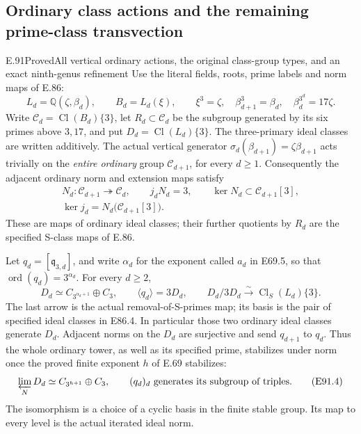 \subsection{Ordinary class actions and the remaining prime-class transvection}

\begin{statement}{E.91}{Proved}{All vertical ordinary actions, the original class-group types, and an exact ninth-genus refinement}
Use the literal fields, roots, prime labels and norm maps of E.86:
\[
 L_d=\mathbb Q(\zeta,\beta_d),\qquad
 B_d=L_d(\xi),\qquad
 \xi^3=\zeta,\quad \beta_{d+1}^3=\beta_d,\quad
 \beta_d^{3^d}=17\zeta .
 \tag{E91.1}
\]
Write $\mathcal C_d=\operatorname{Cl}(B_d)\{3\}$, let $R_d\subset \mathcal C_d$
be the subgroup generated by its six primes above $3,17$, and put
$D_d=\operatorname{Cl}(L_d)\{3\}$. The three-primary ideal
classes are written additively. The actual vertical generator
$\sigma_d(\beta_{d+1})=\zeta\beta_{d+1}$ acts trivially on
the \emph{entire ordinary} group $\mathcal C_{d+1}$, for every $d\ge1$.
Consequently the adjacent ordinary norm and extension maps satisfy
\[
 \begin{gathered}
 N_d:\mathcal C_{d+1}\twoheadrightarrow \mathcal C_d,\qquad
 j_dN_d=3,\qquad
 \ker N_d\subset \mathcal C_{d+1}[3],\\
 \ker j_d=N_d\bigl(\mathcal C_{d+1}[3]\bigr).
 \end{gathered}
 \tag{E91.2}
\]
These are maps of ordinary ideal classes; their further quotients
by $R_d$ are the specified S-class maps of E.86.

Let $q_d=[\mathfrak q_{3,d}]$, and write $\alpha_d$ for the
exponent called $a_d$ in E69.5, so that
$\operatorname{ord}(q_d)=3^{\alpha_d}$. For every $d\ge2$,
\[
 D_d\simeq C_{3^{\alpha_d+1}}\oplus C_3,
 \qquad \langle q_d\rangle=3D_d,
 \qquad D_d/3D_d\xrightarrow{\sim}\operatorname{Cl}_S(L_d)\{3\}.
 \tag{E91.3}
\]
The last arrow is the actual removal-of-S-primes map; its basis is
the pair of specified ideal classes in E86.4. In particular those
two ordinary ideal classes generate $D_d$. Adjacent norms on the
$D_d$ are surjective and send $q_{d+1}$ to $q_d$. Thus the whole
ordinary tower, as well as its specified prime, stabilizes under
norm once the proved finite exponent $h$ of E.69 stabilizes:
\[
 \varprojlim_N D_d\simeq C_{3^{h+1}}\oplus C_3,
 \qquad (q_d)_d\text{ generates its subgroup of triples}.
 \tag{E91.4}
\]
The isomorphism is a choice of a cyclic basis in the finite stable
group. Its map to every level is the actual iterated ideal norm.


\end{statement}
